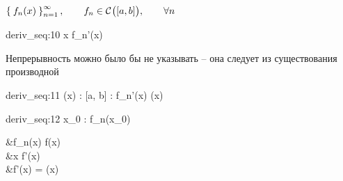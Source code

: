 \begin{theorem}
	$ \Set{f_n(x)}_{n=1}^{\infty}, \qquad f_n \in \mathcal{C}^{} \big( {[a, b]} \big) , \qquad \forall n $
	\begin{equ}{deriv_seq:10}
		\forall x \in [a, b] \quad \exist f_n'(x)
	\end{equ}
	\begin{note}
		Непрерывность можно было бы не указывать -- она следует из существования производной
	\end{note}
	\begin{equ}{deriv_seq:11}
		\exist \vphi(x) : [a, b]  \to \R : \quad f_n'(x)  \vphi(x)
	\end{equ}
	\begin{equ}{deriv_seq:12}
		\exist x_0 \in [a, b] : \quad \exist {} f_n(x_0) \in \R
	\end{equ}
	\begin{mequ}
		&f_n(x)  f(x) \\
		 &\forall x \in [a, b] \quad \exist f'(x) \\
		 &f'(x) = \vphi(x)
	\end{mequ}
\end{theorem}

